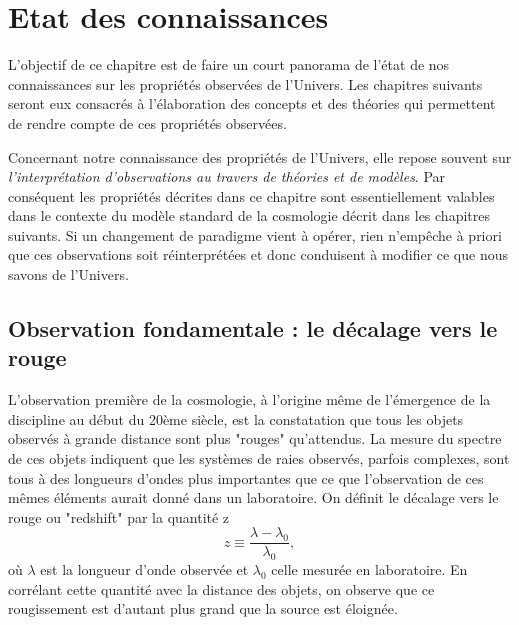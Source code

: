 \chapter{Etat des connaissances}


L'objectif de ce chapitre est de faire un court panorama de l'état de nos connaissances sur les propriétés observées de l'Univers. Les chapitres suivants seront eux consacrés à l'élaboration des concepts et des théories qui permettent de rendre compte de ces propriétés observées. 

Concernant notre connaissance des propriétés de l'Univers, elle repose souvent sur \textit{l'interprétation d'observations au travers de théories et de modèles}. Par conséquent les propriétés décrites dans ce chapitre sont essentiellement valables dans le contexte du modèle standard de la cosmologie décrit dans les chapitres suivants. Si un changement de paradigme vient à opérer, rien n'empêche à priori que ces observations soit réinterprétées et donc conduisent à modifier ce que nous savons de l'Univers.

\section{Observation fondamentale : le décalage vers le rouge}
L'observation première de la cosmologie, à l'origine même de l'émergence de la discipline au début du 20ème siècle, est la constatation que tous les objets observés à grande distance sont plus "rouges" qu'attendus. La mesure du spectre de ces objets indiquent que les systèmes de raies observés, parfois complexes, sont tous à des longueurs d'ondes plus importantes que ce que l'observation de ces mêmes éléments aurait donné dans un laboratoire. On définit le décalage vers le rouge ou "redshift" par la quantité z
\begin{equation}
z\equiv\frac{\lambda-\lambda_0}{\lambda_0},
\end{equation}
où $\lambda$ est la longueur d'onde observée et $\lambda_0$ celle mesurée en laboratoire. En corrélant cette quantité avec la distance des objets, on observe que ce rougissement est d'autant plus grand que la source est éloignée. 

